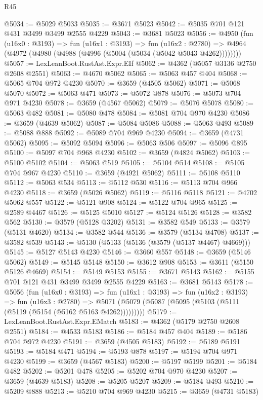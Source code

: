 \begin{lexlean}{R45}
\begin{coremodule}
@5034 := @5029 @5033
@5035 := @3671 @5023
@5042 := @5035 @701 @121 @431 @3499 @3499 @2555 @4229
@5043 := @3681 @5023
@5056 := @4950
    (fun (u16x0 : @3193) =>
    fun (u16x1 : @3193) =>
    fun (u16x2 : @2780) =>
    @4964 (@4972 (@4980 (@4988 (@4996 (@5004 (@5034 (@5042 @5043 @4262))))))))
@5057 := LexLeanBoot.RustAst.Expr.EIf
@5062 := @4362 (@5057 @3136 @2750 @2608 @2551)
@5063 := @4670 @5062
@5065 := @5063 @457 @404
@5068 := @5065 @704 @972 @4230
@5070 := @3659 (@4505 @5062)
@5071 := @5068 @5070
@5072 := @5063 @471
@5073 := @5072 @878
@5076 := @5073 @704 @971 @4230
@5078 := @3659 (@4567 @5062)
@5079 := @5076 @5078
@5080 := @5063 @482
@5081 := @5080 @478
@5084 := @5081 @704 @970 @4230
@5086 := @3659 (@4639 @5062)
@5087 := @5084 @5086
@5088 := @5063 @493
@5089 := @5088 @888
@5092 := @5089 @704 @969 @4230
@5094 := @3659 (@4731 @5062)
@5095 := @5092 @5094
@5096 := @5063 @506
@5097 := @5096 @895
@5100 := @5097 @704 @968 @4230
@5102 := @3659 (@4824 @5062)
@5103 := @5100 @5102
@5104 := @5063 @519
@5105 := @5104 @514
@5108 := @5105 @704 @967 @4230
@5110 := @3659 (@4921 @5062)
@5111 := @5108 @5110
@5112 := @5063 @534
@5113 := @5112 @530
@5116 := @5113 @704 @966 @4230
@5118 := @3659 (@5026 @5062)
@5119 := @5116 @5118
@5121 := @4702 @5062 @557
@5122 := @5121 @908
@5124 := @5122 @704 @965
@5125 := @2589 @4467
@5126 := @5125 @5010
@5127 := @5124 @5126
@5128 := @3582 @562
@5130 := @3579 (@5128 @3202)
@5131 := @3582 @549
@5133 := @3579 (@5131 @4620)
@5134 := @3582 @544
@5136 := @3579 (@5134 @4708)
@5137 := @3582 @539
@5143 := @5130 (@5133 (@5136 (@3579 (@5137 @4467) @4669)))
@5145 := @5127 @5143 @4230
@5146 := @3660 @557
@5148 := @3659 (@5146 @5062)
@5149 := @5145 @5148
@5150 := @3612 @908
@5153 := @3611 (@5150 @5126 @4669)
@5154 := @5149 @5153
@5155 := @3671 @5143
@5162 := @5155 @701 @121 @431 @3499 @3499 @2555 @4229
@5163 := @3681 @5143
@5178 := @5056
    (fun (u16x0 : @3193) =>
    fun (u16x1 : @3193) =>
    fun (u16x2 : @3193) =>
    fun (u16x3 : @2780) =>
    @5071 (@5079 (@5087 (@5095 (@5103 (@5111 (@5119 (@5154 (@5162 @5163 @4262)))))))))
@5179 := LexLeanBoot.RustAst.Expr.EMatch
@5183 := @4362 (@5179 @2750 @2608 @2551)
@5184 := @4533 @5183
@5186 := @5184 @457 @404
@5189 := @5186 @704 @972 @4230
@5191 := @3659 (@4505 @5183)
@5192 := @5189 @5191
@5193 := @5184 @471
@5194 := @5193 @878
@5197 := @5194 @704 @971 @4230
@5199 := @3659 (@4567 @5183)
@5200 := @5197 @5199
@5201 := @5184 @482
@5202 := @5201 @478
@5205 := @5202 @704 @970 @4230
@5207 := @3659 (@4639 @5183)
@5208 := @5205 @5207
@5209 := @5184 @493
@5210 := @5209 @888
@5213 := @5210 @704 @969 @4230
@5215 := @3659 (@4731 @5183)

\end{coremodule}
\end{lexlean}
